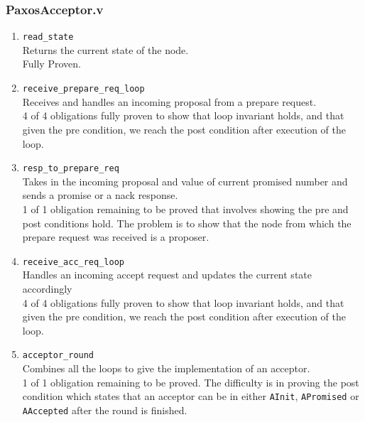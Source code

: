 \vspace{-5mm}
\subsubsection{PaxosAcceptor.v}
\begin{enumerate}
  \item \texttt{read\_state} \\
    Returns the current state of the node. \\
    Fully Proven.
  \item \texttt{receive\_prepare\_req\_loop} \\
    Receives and handles an incoming proposal from
    a prepare request. \\
    4 of 4 obligations fully proven to show that loop invariant holds, and that
    given the pre condition, we reach the post condition after execution of the loop.
  \item \texttt{resp\_to\_prepare\_req} \\
    Takes in the incoming proposal and value of current promised number
    and sends a promise or a nack response. \\
    1 of 1 obligation remaining to be proved that involves showing the pre and post
    conditions hold. The problem is to show that
    the node from which the prepare request was received is a proposer.
  \item \texttt{receive\_acc\_req\_loop} \\
    Handles an incoming accept request and updates the current state accordingly \\
    4 of 4 obligations fully proven to show that loop invariant holds, and that
    given the pre condition, we reach the post condition after execution of the loop.
  \item \texttt{acceptor\_round} \\
    Combines all the loops to give the implementation of an acceptor. \\
    1 of 1 obligation remaining to be proved. The difficulty is in proving
    the post condition which states that an acceptor can be in either \texttt{AInit},
    \texttt{APromised} or \texttt{AAccepted} after the round is finished.
\end{enumerate}

\vspace{-5mm}
